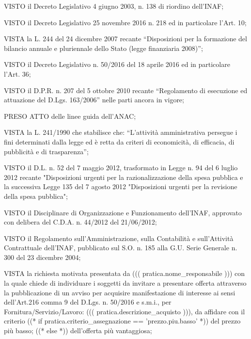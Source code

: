 \documentclass[a4paper,12pt]{letter}
\begin{document}
\begin{list}{VALUTATA}{}
\item[VISTO] il Decreto Legislativo 4 giugno 2003, n. 138 di riordino dell'INAF;
\item[VISTO] il Decreto Legislativo 25 novembre 2016 n. 218 ed in particolare l'Art. 10;
\item[VISTA] la L. 244 del 24 dicembre 2007 recante ``Disposizioni per la formazione 
        del bilancio annuale e pluriennale dello Stato (legge finanziaria 2008)''; 
\item[VISTO]  il Decreto Legislativo n. 50/2016 del 18 aprile 2016 ed in particolare
      l'Art. 36;
\item[VISTO] il D.P.R. n. 207 del 5 ottobre 2010 recante ``Regolamento di esecuzione 
        ed attuazione del D.Lgs. 163/2006'' nelle parti ancora in vigore; 
\item[PRESO ATTO] delle linee guida dell'ANAC;
\item[VISTA] la L. 241/1990 che stabilisce che: ``L'attivit\`a amministrativa persegue i 
        fini determinati dalla legge ed \`e retta da criteri di economicit\`a, di 
        efficacia, di pubblicit\`a e di trasparenza'';
\item[VISTO] il D.L. n. 52 del 7 maggio 2012, trasformato in Legge n. 94 del 6 luglio 2012 
        recante "Disposizioni urgenti per la razionalizzazione della spesa pubblica 
        e la successiva Legge 135 del 7 agosto 2012 "Disposizioni urgenti per la 
        revisione della spesa pubblica"; 
\item[VISTO] il Disciplinare di Organizzazione e Funzionamento dell'INAF, approvato
        con delibera del C.D.A. n. 44/2012 del 21/06/2012;
\item[VISTO] il Regolamento sull'Amministrazione, sulla Contabilit\`a e sull'Attivit\`a 
        Contrattuale dell'INAF, pubblicato sul S.O. n. 185 alla G.U. Serie Generale 
        n. 300 del 23 dicembre 2004;   
\item[VISTA] la richiesta motivata presentata da ((( pratica.nome_responsabile )))
	con la quale chiede di individuare i soggetti da invitare a presentare offerta
	attraverso la pubblicazione di un avviso per acquisire manifestazione
	di interesse ai sensi dell'Art.216 comma 9
        del D.Lgs. n. 50/2016 e s.m.i., per Fornitura/Servizio/Lavoro:
	((( pratica.descrizione_acquisto ))), da affidare con il criterio %
   ((* if pratica.criterio_assegnazione == 'prezzo.piu.basso' *)) %
del prezzo pi\`u basso;
   ((* else *)) %
dell'offerta pi\`u vantaggiosa;

\end{list}
\end{document}
